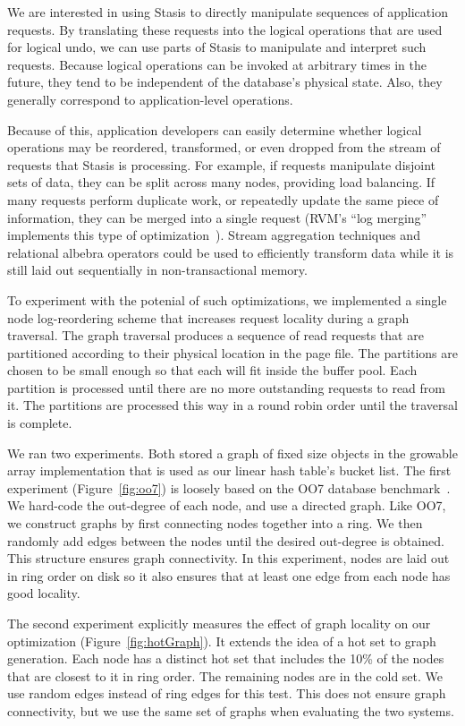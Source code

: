 \documentclass[letterpaper,twocolumn,10pt]{article}
\newcommand{\yad}{Stasis\xspace}
\begin{document}
We are interested in using \yad to directly manipulate sequences of
application requests.  By translating these requests into the logical
operations that are used for logical undo, we can use parts of \yad to
manipulate and interpret such requests.  Because logical operations
can be invoked at arbitrary times in the future, they tend to be
independent of the database's physical state.  Also, they generally
correspond to application-level operations.

Because of this, application developers can easily determine whether
logical operations may be reordered, transformed, or even dropped from
the stream of requests that \yad is processing.  For example, if
requests manipulate disjoint sets of data, they can be split across
many nodes, providing load balancing.  If many requests perform
duplicate work, or repeatedly update the same piece of information,
they can be merged into a single request (RVM's ``log merging''
implements this type of optimization~\cite{lrvm}).  Stream aggregation
techniques and relational albebra operators could be used to
efficiently transform data while it is still laid out sequentially in
non-transactional memory.

To experiment with the potenial of such optimizations, we implemented
a single node log-reordering scheme that increases request locality
during a graph traversal.  The graph traversal produces a sequence of
read requests that are partitioned according to their physical
location in the page file.  The partitions are chosen to be small
enough so that each will fit inside the buffer pool.  Each partition
is processed until there are no more outstanding requests to read from
it.  The partitions are processed this way in a round robin order
until the traversal is complete.

We ran two experiments.  Both stored a graph of fixed size objects in
the growable array implementation that is used as our linear
hash table's bucket list.
The first experiment (Figure~\ref{fig:oo7})
is loosely based on the OO7 database benchmark~\cite{oo7}.  We
hard-code the out-degree of each node, and use a directed graph.  Like OO7, we
construct graphs by first connecting nodes together into a ring.
We then randomly add edges between the nodes until the desired
out-degree is obtained.  This structure ensures graph connectivity.
In this experiment, nodes are laid out in ring order on disk so it also ensures that at least
one edge from each node has good locality.

The second experiment explicitly measures the effect of graph locality
on our optimization (Figure~\ref{fig:hotGraph}). It extends the idea
of a hot set to graph generation.  Each node has a distinct hot set
that includes the 10\% of the nodes that are closest to it in ring
order.  The remaining nodes are in the cold set.  We use random edges
instead of ring edges for this test.  This does not ensure graph
connectivity, but we use the same set of graphs when evaluating the two systems.
\end{document}
